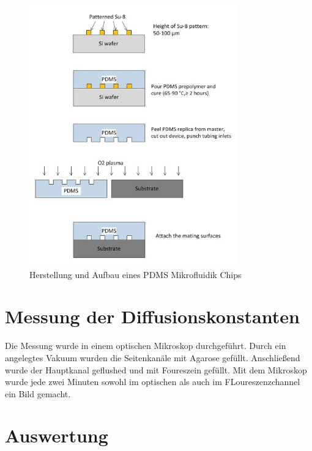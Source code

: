 \documentclass[11pt, a4paper]{article}
\begin{document}
\begin{figure}
    \centering
    \includegraphics[width = 0.8\textwidth]{image.png}
    \caption{Herstellung und Aufbau eines PDMS Mikrofluidik Chips \cite{auf}}
    \label{fig:auf}
\end{figure}

\section{Messung der Diffusionskonstanten}

Die Messung wurde in einem optischen Mikroskop durchgeführt. Durch ein angelegtes Vakuum wurden die Seitenkanäle mit Agarose gefüllt. Anschließend wurde der Hauptkanal geflushed und mit Foureszein gefüllt. Mit dem Mikroskop wurde jede zwei Minuten sowohl im optischen als auch im FLoureszenzchannel ein Bild gemacht.

\section{Auswertung}
\end{document}
